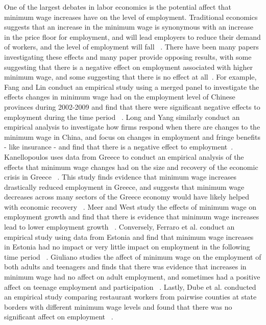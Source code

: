 \documentclass[11pt]{article}
\begin{document}
One of the largest debates in labor economics is the potential affect that
minimum wage increases have on the level of employment. Traditional economics
suggests that an increase in the minimum wage is synonymous with an increase in
the price floor for employment, and will lead employers to reduce their demand
of workers, and the level of employment will fall ~\cite{Kaufman-smith-paper}.
There have been many papers investigating these effects and many paper provide
opposing results, with some suggesting that there is a negative effect on employment
associated with higher minimum wage, and some suggesting that there is no effect
at all~\cite{Meer-dynamics-paper}. For example, Fang and Lin conduct an empirical
study using a merged panel to investigate the effects changes in minimum wage had
on the employment level of Chinese provinces during 2002-2009 and find that there
were significant negative effects to employment during the time period ~\cite{Fang-wage-paper}.
Long and Yang similarly conduct an empirical analysis to investigate how firms
respond when there are changes to the minimum wage in China, and focus on changes
in employment and fringe benefits - like insurance - and find that there is a
negative effect to employment~\cite{Long-wage-paper}. Kanellopoulos uses data
from Greece to conduct an empirical analysis of the effects that minimum wage
changes had on the size and recovery of the economic crisis in Greece ~\cite{Kanellopoulos-greece-paper}.
This study finds evidence that minimum wage increases drastically reduced
employment in Greece, and suggests that minimum wage decreases across many sectors
of the Greece economy would have likely helped with economic recovery ~\cite{Kanellopoulos-greece-paper}.
Meer and West study the effects of minimum wage on employment growth and find
that there is evidence that minimum wage increases lead to lower employment
growth ~\cite{Meer-dynamics-paper}. Conversely, Ferraro et al. conduct an
empirical study using data from Estonia and find that minimum wage increases
in Estonia had no impact or very little impact on employment in the following
time period ~\cite{Ferraro-estonia-paper}. Giuliano studies the affect of
minimum wage on the employment of both adults and teenagers and finds that
there was evidence that increases in minimum wage had no affect on adult
employment, and sometimes had a positive affect on teenage employment and
participation ~\cite{Giuliano-teen-paper}. Lastly, Dube et al. conducted an
empirical study comparing restaurant workers from pairwise counties at state
borders with different minimum wage levels and found that there was no significant
affect on employment ~\cite{Dube-pairwise-paper}.
\end{document}
